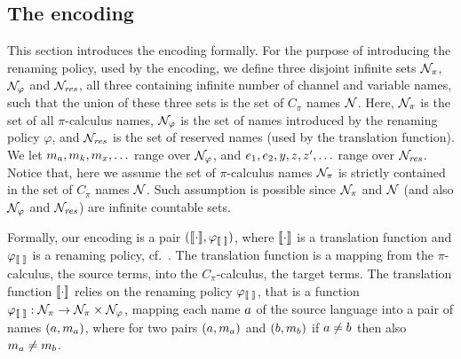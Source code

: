 \subsection{The encoding}\label{subsec:the_encoding}
This section introduces the encoding formally.
For the purpose of introducing the renaming policy, used by the encoding, we define three disjoint infinite sets ${\cal N}_\pi$, ${\cal N}_{\varphi}$ and ${\cal N}_{\mathit{res}}$, all three containing infinite number of channel and variable names, such that the union of these three sets is the set of $C_\pi$ names ${\cal N}$. Here, ${\cal N}_\pi$ is the set of all $\pi$-calculus names, ${\cal N}_{\varphi}$ is the set of names introduced by the renaming policy $\varphi$, and ${\cal N}_{\mathit{res}}$ is the set of reserved names (used by the translation function). We let $m_a, m_k, m_x, \ldots$ range over ${\cal N}_{\varphi}$, and $e_1, e_2, y, z, z', \ldots$ range over ${\cal N}_{\mathit{res}}$. Notice that, here we assume the set of $\pi$-calculus names ${\cal N}_\pi$ is strictly contained in the set of $C_\pi$ names ${\cal N}$. Such assumption is possible since ${\cal N}_\pi$ and ${\cal N}$ (and also ${\cal N}_\varphi$ and ${\cal N}_{\mathit{res}}$) are infinite countable sets.


Formally, our encoding is a pair $(\llbracket \cdot \rrbracket, \varphi_{\llbracket \; \rrbracket})$, where $\llbracket \cdot \rrbracket$ is a translation function and $\varphi_{\llbracket \; \rrbracket}$ is a renaming policy, cf.~\cite{DBLP:journals/iandc/Gorla10}. 
The translation function is a mapping from the $\pi$-calculus, the source terms, into the $C_\pi$-calculus, the target terms. 
The translation function $\llbracket \cdot \rrbracket$ relies on the renaming policy $\varphi_{\llbracket \; \rrbracket}$, that is a function $\varphi_{\llbracket \; \rrbracket}: {\cal N}_\pi \to {\cal N}_\pi\times {\cal N}_\varphi$, mapping each name $a$ of the source language into a pair of %
names $(a, m_a)$, %
where for two pairs $(a, m_a)$ and $(b, m_b)$ if $a\not=b$ then also $m_a\not=m_b$. 





